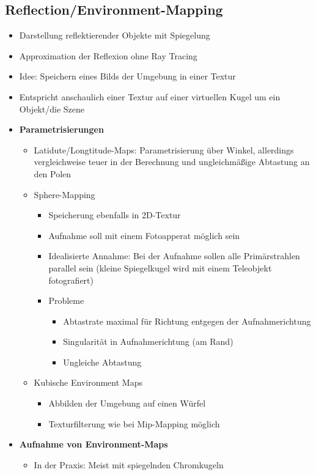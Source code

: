 \subsection{Reflection/Environment-Mapping}
\begin{itemize}
	\item Darstellung reflektierender Objekte mit Spiegelung
	\item Approximation der Reflexion ohne Ray Tracing
	\item Idee: Speichern eines Bilds der Umgebung in einer Textur
	\item Entspricht anschaulich einer Textur auf einer virtuellen Kugel um ein Objekt/die Szene
	\item \textbf{Parametrisierungen}
	\begin{itemize}
		\item Latidute/Longtitude-Maps: Parametrisierung über Winkel, allerdings vergleichweise teuer in der Berechnung und ungleichmäßige Abtastung an den Polen
		\item Sphere-Mapping
		\begin{itemize}
			\item Speicherung ebenfalls in 2D-Textur
			\item Aufnahme soll mit einem Fotoapperat möglich sein
			\item Idealisierte Annahme: Bei der Aufnahme sollen alle Primärstrahlen parallel sein (kleine Spiegelkugel wird mit einem Teleobjekt fotografiert)
			\item Probleme
			\begin{itemize}
				\item Abtastrate maximal für Richtung entgegen der Aufnahmerichtung
				\item Singularität in Aufnahmerichtung (am Rand)
				\item Ungleiche Abtastung
			\end{itemize}
		\end{itemize}
		\item Kubische Environment Maps
		\begin{itemize}
			\item Abbilden der Umgebung auf einen Würfel
			\item Texturfilterung wie bei Mip-Mapping möglich
		\end{itemize}
	\end{itemize}
	\item \textbf{Aufnahme von Environment-Maps}
	\begin{itemize}
		\item In der Praxis: Meist mit spiegelnden Chromkugeln

\end{itemize}
\end{itemize}
